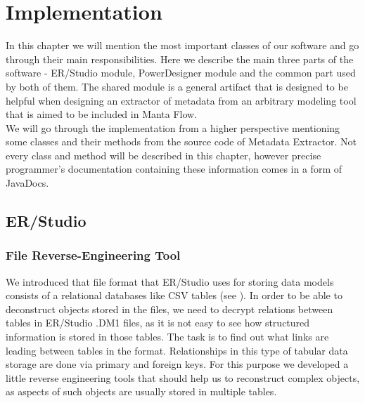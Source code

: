 \chapter{Implementation}
\label{implementation}

In this chapter we will mention the most important classes of our software and go through their main responsibilities. Here we describe the main three parts of the software - ER/Studio module, PowerDesigner module and the common part used by both of them. The shared module is a general artifact that is designed to be helpful when designing an extractor of metadata from an arbitrary modeling tool that is aimed to be included in Manta Flow. \\

We will go through the implementation from a higher perspective mentioning some classes and their methods from the source code of Metadata Extractor. 
Not every class and method will be described in this chapter, however precise programmer's documentation containing these information comes in a form of JavaDocs.

\section{ER/Studio}

\subsection{File Reverse-Engineering Tool}
\label{subsec:dm1_tool}

We introduced that file format that ER/Studio uses for storing data models consists of a relational databases like CSV tables (see ).
In order to be able to deconstruct objects stored in the files, we need to decrypt relations between tables in ER/Studio .DM1 files, as it is not easy to see how structured information is stored in those tables.
The task is to find out what links are leading between tables in the format. Relationships in this type of tabular data storage are done via primary and foreign keys. For this purpose we developed a little reverse engineering tools that should help us to reconstruct complex objects, as aspects of such objects are usually stored in multiple tables. \\

